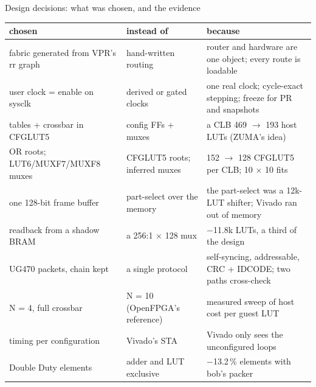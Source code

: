 \documentclass[aspectratio=169,11pt]{beamer}
\begin{document}
\begin{frame}{Design decisions: what was chosen, and the evidence}
  \centering
  \scriptsize
  \renewcommand{\arraystretch}{1.1}
  \begin{tabular}{@{}L{40mm}L{32mm}L{58mm}@{}}
    \toprule
    \textbf{chosen} & \textbf{instead of} & \textbf{because} \\
    \midrule
    fabric generated from VPR's rr graph & hand-written routing & router and hardware are one object; every route is loadable \\
    user clock = enable on sysclk & derived or gated clocks & one real clock; cycle-exact stepping; freeze for PR and snapshots \\
    tables + crossbar in CFGLUT5 & config FFs + muxes & a CLB 469 $\rightarrow$ 193 host LUTs (ZUMA's idea) \\
    OR roots; LUT6/MUXF7/MUXF8 muxes & CFGLUT5 roots; inferred muxes & 152 $\rightarrow$ 128 CFGLUT5 per CLB; 10 $\times$ 10 fits \\
    one 128-bit frame buffer & part-select over the memory & the part-select was a 12k-LUT shifter; Vivado ran out of memory \\
    readback from a shadow BRAM & a 256:1 $\times$ 128 mux & $-$11.8k LUTs, a third of the design \\
    UG470 packets, chain kept & a single protocol & self-syncing, addressable, CRC + IDCODE; two paths cross-check \\
    N = 4, full crossbar & N = 10 (OpenFPGA's reference) & measured sweep of host cost per guest LUT \\
    timing per configuration & Vivado's STA & Vivado only sees the unconfigured loops \\
    Double Duty elements & adder and LUT exclusive & $-$13.2\,\% elements with bob's packer \\
    \bottomrule
  \end{tabular}
\end{frame}
\end{document}
